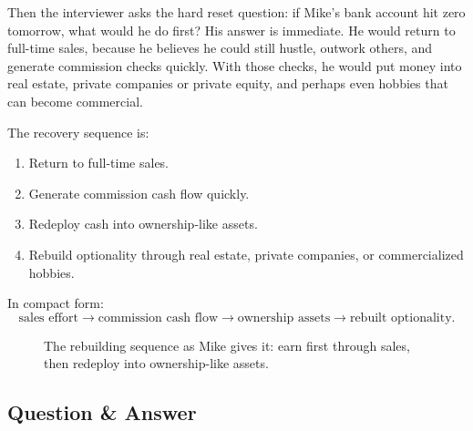 Then the interviewer asks the hard reset question: if Mike's bank account hit zero tomorrow, what would he do first? His answer is immediate. He would return to full-time sales, because he believes he could still hustle, outwork others, and generate commission checks quickly. With those checks, he would put money into real estate, private companies or private equity, and perhaps even hobbies that can become commercial.

The recovery sequence is:
\begin{enumerate}
\item Return to full-time sales.
\item Generate commission cash flow quickly.
\item Redeploy cash into ownership-like assets.
\item Rebuild optionality through real estate, private companies, or commercialized hobbies.
\end{enumerate}

In compact form:
\begin{equation}
\text{sales effort}
\longrightarrow
\text{commission cash flow}
\longrightarrow
\text{ownership assets}
\longrightarrow
\text{rebuilt optionality}.
\end{equation}

\begin{figure}
\centering
{}
\caption{The rebuilding sequence as Mike gives it: earn first through sales, then redeploy into ownership-like assets.}
\end{figure}

\subsection{Question \& Answer}

